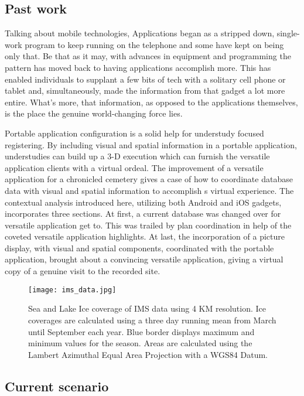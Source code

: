\subsection{Past work}
Talking about mobile technologies, Applications began as a stripped down, single-work program to keep running on the telephone and some have kept on being only that. Be that as it may, with advances in equipment and programming the pattern has moved back to having applications accomplish more. This has enabled individuals to supplant a few bits of tech with a solitary cell phone or tablet and, simultaneously, made the information from that gadget a lot more entire. What's more, that information, as opposed to the applications themselves, is the place the genuine world-changing force lies.

Portable application configuration is a solid help for understudy focused registering. By including visual and spatial information in a portable application, understudies can build up a 3-D execution which can furnish the versatile application clients with a virtual ordeal. The improvement of a versatile application for a chronicled cemetery gives a case of how to coordinate database data with visual and spatial information to accomplish s virtual experience. The contextual analysis introduced here, utilizing both Android and \gls{iOS} gadgets, incorporates three sections. At first, a current database was changed over for versatile application get to. This was trailed by plan coordination in help of the coveted versatile application highlights. At last, the incorporation of a picture display, with visual and spatial components, coordinated with the portable application, brought about a convincing versatile application, giving a virtual copy of a genuine visit to the recorded site.

%
\begin{figure}[ht]
  \centering
  \begin{minipage}{4.5in}
    \texttt{[image: ims\_data.jpg]}
    \caption{ \label{fig:nat_ice} Sea and Lake Ice coverage of IMS data using 4 KM resolution. Ice coverages are calculated using a three day running mean from March until September each year. Blue border displays maximum and minimum values for the season. Areas are calculated using the Lambert Azimuthal Equal Area Projection with a WGS84 Datum. \cite{nat_ice}}
  \end{minipage}
\end{figure}
%


\subsection{Current scenario}

